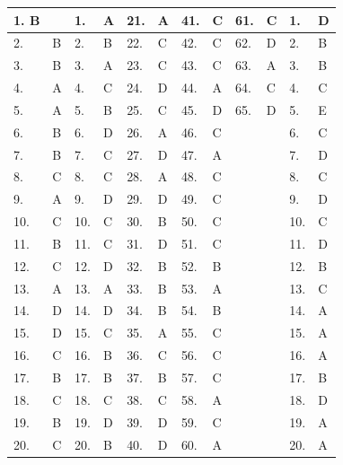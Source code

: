 \documentclass[11pt,letterpaper]{article}
\begin{document}
\begin{center}
\small
\begin{tabular}{|l|l|l|l|l|l|l|l|l|l|l|l|}
\hline
1. B &  & 1. & A & 21. & A & 41. & C & 61. & C & 1. & D \\
\hline
2.  & B & 2. & B & 22. & C & 42. & C & 62. & D & 2. & B \\
\hline
3.  & B & 3. & A & 23. & C & 43. & C & 63. & A & 3. & B \\
\hline
4.  & A & 4. & C & 24. & D & 44. & A & 64. & C & 4. & C \\
\hline
5.  & A & 5. & B & 25. & C & 45. & D & 65. & D & 5. & E \\
\hline
6.  & B & 6. & D & 26. & A & 46. & C &  &  & 6. & C \\
\hline
7.  & B & 7. & C & 27. & D & 47. & A &  &  & 7. & D \\
\hline
8.  & C & 8. & C & 28. & A & 48. & C &  &  & 8. & C \\
\hline
9.  & A & 9. & D & 29. & D & 49. & C &  &  & 9. & D \\
\hline
10. & C & 10. & C & 30. & B & 50. & C &  &  & 10. & C \\
\hline
11. & B & 11. & C & 31. & D & 51. & C &  &  & 11. & D \\
\hline
12. & C & 12. & D & 32. & B & 52. & B &  &  & 12. & B \\
\hline
13. & A & 13. & A & 33. & B & 53. & A &  &  & 13. & C \\
\hline
14. & D & 14. & D & 34. & B & 54. & B &  &  & 14. & A \\
\hline
15. & D & 15. & C & 35. & A & 55. & C &  &  & 15. & A \\
\hline
16. & C & 16. & B & 36. & C & 56. & C &  &  & 16. & A \\
\hline
17. & B & 17. & B & 37. & B & 57. & C &  &  & 17. & B \\
\hline
18. & C & 18. & C & 38. & C & 58. & A &  &  & 18. & D \\
\hline
19. & B & 19. & D & 39. & D & 59. & C &  &  & 19. & A \\
\hline
20. & C & 20. & B & 40. & D & 60. & A &  &  & 20. & A \\
\hline
\end{tabular}
\end{center}
\end{document}
